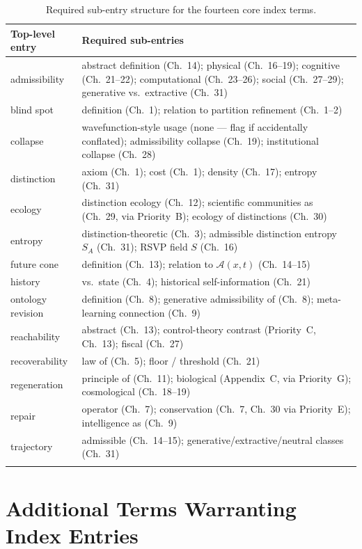 \documentclass[11pt]{report}
\newcommand{\adm}{\mathcal{A}}
\begin{document}
\begin{longtable}{@{}p{3.2cm}p{10.8cm}@{}}
\toprule
Top-level entry & Required sub-entries \\
\midrule
\endhead
admissibility & abstract definition (Ch.~14); physical (Ch.~16--19); cognitive (Ch.~21--22); computational (Ch.~23--26); social (Ch.~27--29); generative vs.\ extractive (Ch.~31) \\
blind spot & definition (Ch.~1); relation to partition refinement (Ch.~1--2) \\
collapse & wavefunction-style usage (none --- flag if accidentally conflated); admissibility collapse (Ch.~19); institutional collapse (Ch.~28) \\
distinction & axiom (Ch.~1); cost (Ch.~1); density (Ch.~17); entropy (Ch.~31) \\
ecology & distinction ecology (Ch.~12); scientific communities as (Ch.~29, via Priority~B); ecology of distinctions (Ch.~30) \\
entropy & distinction-theoretic (Ch.~3); admissible distinction entropy $S_A$ (Ch.~31); RSVP field $S$ (Ch.~16) \\
future cone & definition (Ch.~13); relation to $\adm(x,t)$ (Ch.~14--15) \\
history & vs.\ state (Ch.~4); historical self-information (Ch.~21) \\
ontology revision & definition (Ch.~8); generative admissibility of (Ch.~8); meta-learning connection (Ch.~9) \\
reachability & abstract (Ch.~13); control-theory contrast (Priority~C, Ch.~13); fiscal (Ch.~27) \\
recoverability & law of (Ch.~5); floor / threshold (Ch.~21) \\
regeneration & principle of (Ch.~11); biological (Appendix~C, via Priority~G); cosmological (Ch.~18--19) \\
repair & operator (Ch.~7); conservation (Ch.~7, Ch.~30 via Priority~E); intelligence as (Ch.~9) \\
trajectory & admissible (Ch.~14--15); generative/extractive/neutral classes (Ch.~31) \\
\bottomrule
\caption{Required sub-entry structure for the fourteen core
  index terms.}
\label{tab:priority-h}
\end{longtable}

\section{Additional Terms Warranting Index Entries}
\end{document}

